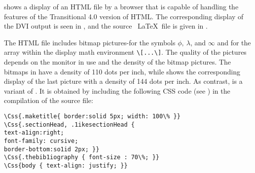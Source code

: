 

 shows a display of an HTML file by a browser that is capable
of handling the features of the Transitional 4.0 version of HTML. The
corresponding display of the DVI output is seen in , and the
source \ \LaTeX\  file is given in . 

The HTML file includes bitmap pictures-for the symbols $\phi,\ \lambda$, and
$\infty$ and for the array within the display math environment \verb|\[...\]|.
The quality of the pictures depends on the monitor in use and the density of
the bitmap pictures. The 
bitmaps in  have a density of 110 dots per inch, while  shows 
the corresponding display of the last picture with a density of 144 dots per inch. 
As contrast,  is a variant of . It is obtained by including the 
following CSS code (see ) in the compilation of the source file: 

\begin{verbatim}
\Css{.maketitle{ border:solid 5px; width: 100\% }} 
\Css{.sectionHead, .1ikesectionHead { 
text-a1ign:right; 
font-family: cursive; 
border-bottom:so1id 2px; }} 
\Css{.thebib1iography { font-size : 70\%; }} 
\Css{body { text-align: justify; }} 
\end{verbatim}
